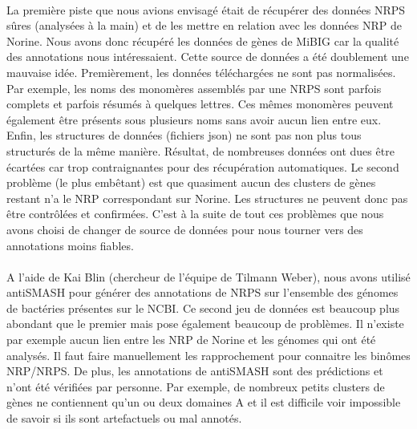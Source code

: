 \documentclass[12pt,french,twoside]{report}
\begin{document}
\paragraph{}La première piste que nous avions envisagé était de récupérer des données NRPS sûres (analysées à la main) et de les mettre en relation avec les données NRP de Norine.
Nous avons donc récupéré les données de gènes de MiBIG car la qualité des annotations nous intéressaient.
Cette source de données a été doublement une mauvaise idée.
Premièrement, les données téléchargées ne sont pas normalisées.
Par exemple, les noms des monomères assemblés par une NRPS sont parfois complets et parfois résumés à quelques lettres.
Ces mêmes monomères peuvent également être présents sous plusieurs noms sans avoir aucun lien entre eux.
Enfin, les structures de données (fichiers json) ne sont pas non plus tous structurés de la même manière.
Résultat, de nombreuses données ont dues être écartées car trop contraignantes pour des récupération automatiques.
Le second problème (le plus embêtant) est que quasiment aucun des clusters de gènes restant n'a le NRP correspondant sur Norine.
Les structures ne peuvent donc pas être contrôlées et confirmées.
C'est à la suite de tout ces problèmes que nous avons choisi de changer de source de données pour nous tourner vers des annotations moins fiables.

\paragraph{}A l'aide de Kai Blin (chercheur de l'équipe de Tilmann Weber), nous avons utilisé antiSMASH pour générer des annotations de NRPS sur l'ensemble des génomes de bactéries présentes sur le NCBI.
Ce second jeu de données est beaucoup plus abondant que le premier mais pose également beaucoup de problèmes.
Il n'existe par exemple aucun lien entre les NRP de Norine et les génomes qui ont été analysés.
Il faut faire manuellement les rapprochement pour connaitre les binômes NRP/NRPS.
De plus, les annotations de antiSMASH sont des prédictions et n'ont été vérifiées par personne.
Par exemple, de nombreux petits clusters de gènes ne contiennent qu'un ou deux domaines A et il est difficile voir impossible de savoir si ils sont artefactuels ou mal annotés.
\end{document}
